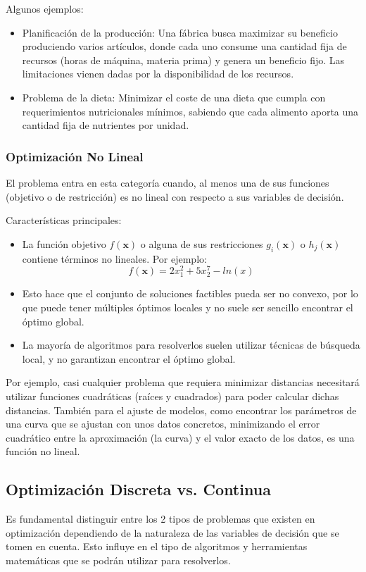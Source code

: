 \documentclass[12pt,a4paper]{book}
\begin{document}
Algunos ejemplos:
\begin{itemize}
    \item Planificación de la producción: Una fábrica busca maximizar su beneficio produciendo varios artículos, donde cada uno consume una cantidad fija de recursos (horas de máquina, materia prima) y genera un beneficio fijo. Las limitaciones vienen dadas por la disponibilidad de los recursos.
    \item Problema de la dieta: Minimizar el coste de una dieta que cumpla con requerimientos nutricionales mínimos, sabiendo que cada alimento aporta una cantidad fija de nutrientes por unidad.
\end{itemize}




\subsubsection{Optimización No Lineal}
El problema entra en esta categoría cuando, al menos una de sus funciones (objetivo o de restricción) es no lineal con respecto a sus variables de decisión. 

Características principales:
\begin{itemize}
    \item La función objetivo $f(\mathbf{x})$ o alguna de sus restricciones $g_i(\mathbf{x})$ o $h_j(\mathbf{x})$ contiene términos no lineales. Por ejemplo:
    $$f(\mathbf{x})=2x_1^2+5x_2^7-ln(x)$$
    \item Esto hace que el conjunto de soluciones factibles pueda ser no convexo, por lo que puede tener múltiples óptimos locales y no suele ser sencillo encontrar el óptimo global.
    \item La mayoría de algoritmos para resolverlos suelen utilizar técnicas de búsqueda local, y no garantizan encontrar el óptimo global.
\end{itemize}

Por ejemplo, casi cualquier problema que requiera minimizar distancias necesitará utilizar funciones cuadráticas (raíces y cuadrados) para poder calcular dichas distancias.
También para el ajuste de modelos, como encontrar los parámetros de una curva que se ajustan con unos datos concretos, minimizando el error cuadrático entre la aproximación (la curva) y el valor exacto de los datos, es una función no lineal.



\subsection{Optimización Discreta vs. Continua}
Es fundamental distinguir entre los 2 tipos de problemas que existen en optimización dependiendo de la naturaleza de las variables de decisión que se tomen en cuenta. Esto influye en el tipo de algoritmos y herramientas matemáticas que se podrán utilizar para resolverlos.
\end{document}
